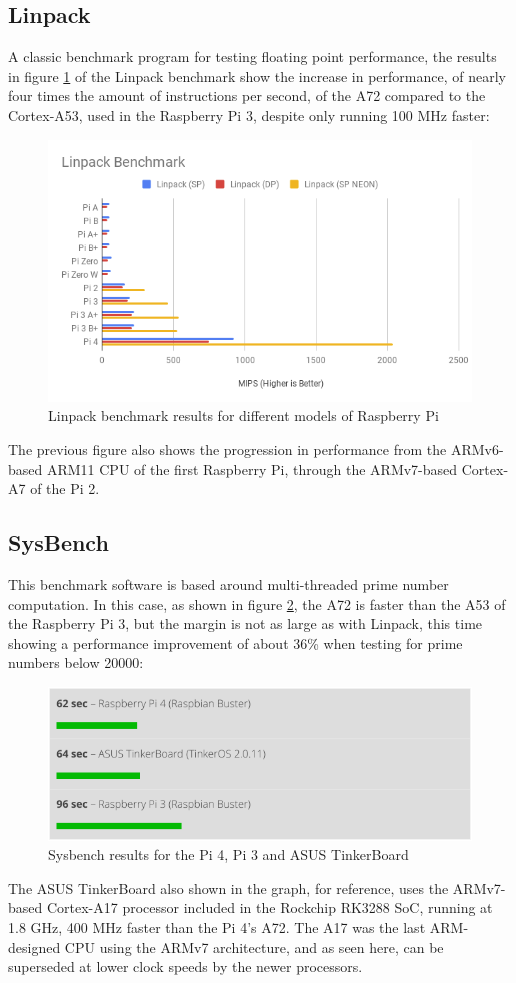 \subsection*{Linpack}
\hspace{\parindent}A classic benchmark program for testing floating point performance, the results in figure \ref{linpack} of the Linpack benchmark show the increase in performance, of nearly four times the amount of instructions per second, of the A72 compared to the Cortex-A53, used in the Raspberry Pi 3, despite only running 100 MHz faster: \cite{linpack}
\begin{figure}[H]
	\begin{center}
		\includegraphics[width=0.7\linewidth]{imgs/linpack.png}
		\caption{Linpack benchmark results for different models of Raspberry Pi}
		\label{linpack}
	\end{center}
\end{figure}
The previous figure also shows the progression in performance from the ARMv6-based ARM11 CPU of the first Raspberry Pi, through the ARMv7-based Cortex-A7 of the Pi 2.
\subsection*{SysBench}
\hspace{\parindent}This benchmark software is based around multi-threaded prime number computation. In this case, as shown in figure \ref{sysbench}, the A72 is faster than the A53 of the Raspberry Pi 3, but the margin is not as large as with Linpack, this time showing a performance improvement of about 36\% when testing for prime numbers below 20000: \cite{sysbench}
\begin{figure}[H]
	\begin{center}
		\includegraphics[width=0.7\linewidth]{imgs/sysbench.png}
		\caption{Sysbench results for the Pi 4, Pi 3 and ASUS TinkerBoard}
		\label{sysbench}
	\end{center}
\end{figure}
The ASUS TinkerBoard also shown in the graph, for reference, uses the ARMv7-based Cortex-A17 processor included in the Rockchip RK3288 SoC, running at 1.8 GHz, 400 MHz faster than the Pi 4's A72. The A17 was the last ARM-designed CPU using the ARMv7 architecture, and as seen here, can be superseded at lower clock speeds by the newer processors.